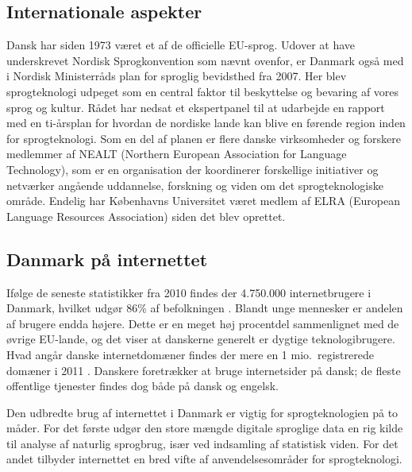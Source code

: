 \begin{multicols}{2}
\subsection{Internationale aspekter}

 Dansk har siden 1973 v\ae ret et af de officielle EU-sprog.  Udover at have underskrevet Nordisk Sprogkonvention som n\ae vnt ovenfor, er Danmark \mbox{ogs\aa} med i Nordisk Ministerr\aa ds plan for sproglig bevidsthed fra 2007. Her blev sprogteknologi udpeget som en central faktor til beskyttelse og bevaring af vores sprog og kultur. R\aa det har nedsat et ekspertpanel til at udarbejde en rapport med en ti-\aa rsplan for hvordan de nordiske lande kan blive en f\o rende region inden for sprogtek\-nologi. Som en del af planen er flere danske virksomheder og forskere medlemmer af NEALT (Northern European Association for Language Technology), som er en organisation der koordinerer forskellige initiativer og netv\ae rker ang\aa ende uddannelse, forskning og viden om det sprogteknologiske omr\aa de. Endelig har K\o benhavns Universitet v\ae ret medlem af ELRA (European Language Resources Association) siden det blev oprettet.


\subsection{Danmark på internettet}

  If\o lge de seneste statistikker fra 2010 findes der 4.750.000 internetbrugere i Danmark, hvilket udg\o r 86\% af befolkningen \cite{worldstats}. Blandt unge mennesker er andelen af brugere endda h\o jere. Dette er en meget h\o j procentdel sammenlignet med de \o vrige EU-lande, og det viser at danskerne generelt er dygtige teknologibrugere. Hvad ang\aa r danske internetdom\ae ner findes der mere en 1 mio.\ registrerede dom\ae ner i 2011 \cite{hostmaster}. Danskere foretr\ae kker at bruge internetsider \mbox{p\aa} dansk; de fleste offentlige tjenester findes dog b\aa de \mbox{p\aa} dansk og engelsk.


Den udbredte brug af internettet i Danmark er vigtig for sprogteknologien \mbox{p\aa} to m\aa der. For det f\o rste udg\o r den store m\ae ngde digitale sproglige data en rig kilde til analyse af naturlig sprogbrug, is\ae r ved indsamling af stati\-stisk viden. For det andet tilbyder internettet en bred vifte af anvendelsesomr\aa der for sprogteknologi.


\end{multicols}
